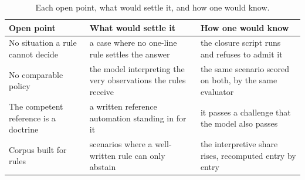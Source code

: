 \begin{table}[H]
\centering
\caption{Each open point, what would settle it, and how one would know.}
\label{tab:jusquou}
\small
\begin{tabularx}{\linewidth}{@{}>{\raggedright\arraybackslash}p{3.4cm}Y>{\raggedright\arraybackslash}p{4.0cm}@{}}
\toprule
Open point & What would settle it & How one would know \\
\midrule
No situation a rule cannot decide & a case where no one-line rule settles the answer &
the closure script runs and refuses to admit it \\
No comparable policy & the model interpreting the very observations the rules
receive & the same scenario scored on both, by the same evaluator \\
The competent reference is a doctrine & a written reference automation standing in
for it & it passes a challenge that the model also passes \\
Corpus built for rules & scenarios where a well-written rule can only abstain &
the interpretive share rises, recomputed entry by entry \\
\bottomrule
\end{tabularx}
\end{table}

